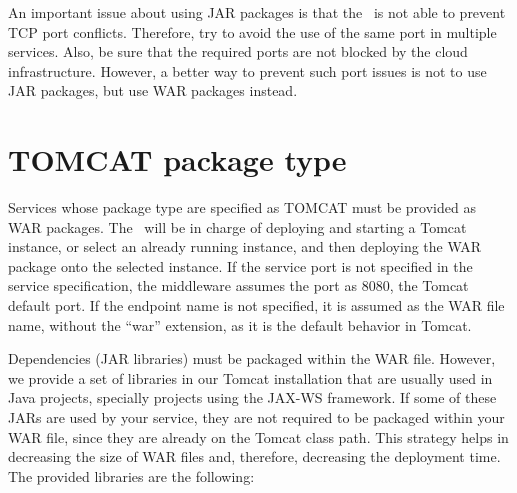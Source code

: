 An important issue about using JAR packages is that the \ee\ is not able to prevent TCP port conflicts. Therefore, try to avoid the use of the same port in multiple services. Also, be sure that the required ports are not blocked by the cloud infrastructure. However, a better way to prevent such port issues is not to use JAR packages, but use WAR packages instead.


\section{TOMCAT package type}

Services whose package type are specified as TOMCAT must be provided as WAR packages. The \ee\ will be in charge of deploying and starting a Tomcat instance, or select an already running instance, and then deploying the WAR package onto the selected instance. If the service port is not specified in the service specification, the middleware assumes the port as 8080, the Tomcat default port. If the endpoint name is not specified, it is assumed as the WAR file name, without the ``war'' extension, as it is the default behavior in Tomcat.  

Dependencies (JAR libraries) must be packaged within the WAR file. However, we provide a set of libraries in our Tomcat installation that are usually used in Java projects, specially projects using the JAX-WS framework. If some of these JARs are used by your service, they are not required to be packaged within your WAR file, since they are already on the Tomcat class path. This strategy helps in decreasing the size of WAR files and, therefore, decreasing the deployment time. The provided libraries are the following:

